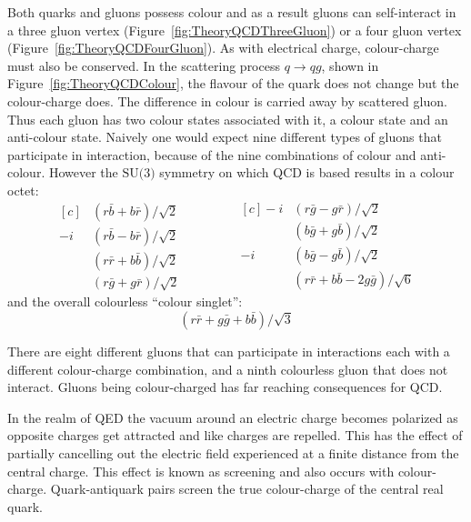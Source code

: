 Both quarks and gluons possess colour and as a result gluons can self-interact in a three gluon vertex (Figure~\ref{fig:TheoryQCDThreeGluon}) or a four gluon vertex (Figure~\ref{fig:TheoryQCDFourGluon}). As with electrical charge, colour-charge must also be conserved. In the scattering process $q\rightarrow qg$, shown in Figure~\ref{fig:TheoryQCDColour}, the flavour of the quark does not change but the colour-charge does. The difference in colour is carried away by scattered gluon. Thus each gluon has two colour states associated with it, a colour state and an anti-colour state. Naively one would expect nine different types of gluons that participate in interaction, because of the nine combinations of colour and anti-colour. However the $\textrm{SU(3)}$ symmetry on which QCD is based results in a colour octet:
%
\begin{equation}
  \begin{aligned}[c]
    &(r\bar{b}+b\bar{r})/\sqrt{2} \\
    -i&(r\bar{b}-b\bar{r})/\sqrt{2} \\
    &(r\bar{r}+b\bar{b})/\sqrt{2} \\
    &(r\bar{g}+g\bar{r})/\sqrt{2}
  \end{aligned}
  \qquad\qquad
  \begin{aligned}[c]
    -i&(r\bar{g}-g\bar{r})/\sqrt{2} \\
    &(b\bar{g}+g\bar{b})/\sqrt{2} \\
    -i&(b\bar{g}-g\bar{b})/\sqrt{2} \\
    &(r\bar{r}+b\bar{b}-2g\bar{g})/\sqrt{6}
  \end{aligned}
\end{equation}
%
and the overall colourless ``colour singlet'':
%
\begin{equation}
  (r\bar{r} + g\bar{g} + b\bar{b})/\sqrt{3}
\end{equation}

There are eight different gluons that can participate in interactions each with a different colour-charge combination, and a ninth colourless gluon that does not interact. Gluons being colour-charged has far reaching consequences for QCD\@.

In the realm of QED the vacuum around an electric charge becomes polarized as opposite charges get attracted and like charges are repelled. This has the effect of partially cancelling out the electric field experienced at a finite distance from the central charge. This effect is known as screening and also occurs with colour-charge. Quark-antiquark pairs screen the true colour-charge of the central real quark.

